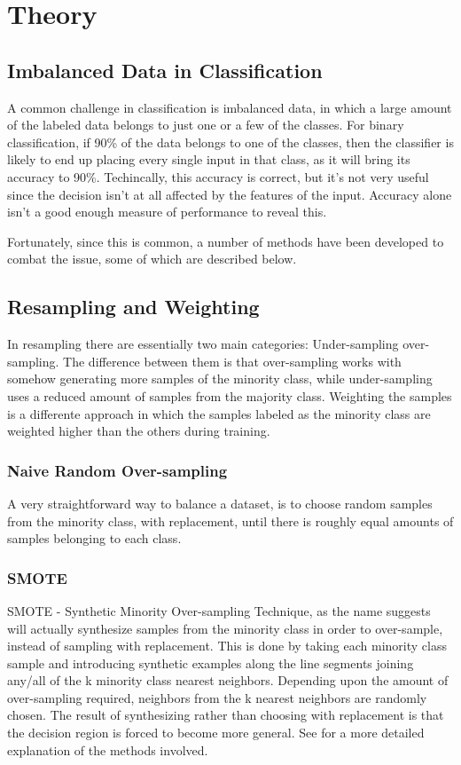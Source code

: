 \section{Theory}
\subsection{Imbalanced Data in Classification}
A common challenge in classification is imbalanced data, in which a large
amount of the labeled data belongs to just one or a few of the classes.
For binary classification, if 90\% of the data belongs to one of the classes,
then the classifier is likely to end up placing every single
input in that class, as it will bring its accuracy to 90\%. Techincally, this
accuracy is correct, but it's not very useful since the decision isn't at all
affected by the features of the input. Accuracy alone isn't a good enough
measure of performance to reveal this.

Fortunately, since this is common, a number of methods have been developed
to combat the issue, some of which are described below.

\subsection{Resampling and Weighting}
In resampling there are essentially two main categories: Under-sampling
over-sampling. The difference between them is that over-sampling works with
somehow generating more samples of the minority class, while under-sampling
uses a reduced amount of samples from the majority class.
Weighting the samples is a differente approach in which the samples labeled
as the minority class are weighted higher than the others during training.

\subsubsection{Naive Random Over-sampling}
A very straightforward way to balance a dataset, is to choose random samples 
from the minority class, with replacement, until there is roughly equal
amounts of samples belonging to each class.

\subsubsection{SMOTE}
SMOTE - Synthetic Minority Over-sampling Technique, as the name suggests will
actually synthesize samples from the minority class in order to over-sample,
instead of sampling with replacement. This is done by taking each minority 
class sample and introducing synthetic examples along the line segments joining 
any/all of the k minority class nearest neighbors. Depending upon the amount of 
over-sampling required, neighbors from the k nearest neighbors are randomly
chosen. The result of synthesizing rather than choosing with replacement is
that the decision region is forced to become more general.
See \cite{smote-article} for a more detailed explanation of the methods
involved.

